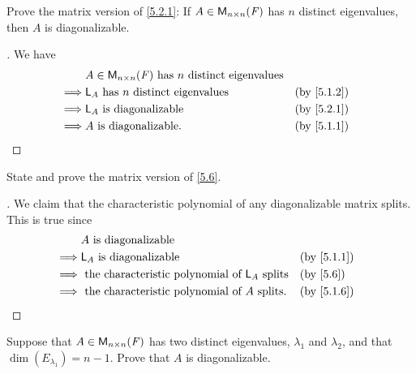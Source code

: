 \exercisesection

\setcounter{ex}{3}
\begin{ex}\label{ex:5.2.4}
	Prove the matrix version of \cref{5.2.1}:
	If \(A \in \mathsf{M}_{{n} \times n}({\mathit{F}})\) has \(n\) distinct eigenvalues, then \(A\) is diagonalizable.
\end{ex}

\begin{proof}[]
	We have
	\begin{align*}
		         & A \in \ms{n}{n}{\F} \text{ has } n \text{ distinct  eigenvalues}                 \\
		\implies & \L_A \text{ has } n \text{ distinct  eigenvalues}                &  & \by{5.1.2} \\
		\implies & \L_A \text{ is diagonalizable}                                   &  & \by{5.2.1} \\
		\implies & A \text{ is diagonalizable}.                                     &  & \by{5.1.1}
	\end{align*}
\end{proof}

\begin{ex}\label{ex:5.2.5}
	State and prove the matrix version of \cref{5.6}.
\end{ex}

\begin{proof}[]
	We claim that the characteristic polynomial of any diagonalizable matrix splits.
	This is true since
	\begin{align*}
		         & A \text{ is diagonalizable}                                                   \\
		\implies & \L_A \text{ is diagonalizable}                                &  & \by{5.1.1} \\
		\implies & \text{ the characteristic polynomial of } \L_A \text{ splits} &  & \by{5.6}   \\
		\implies & \text{ the characteristic polynomial of } A \text{ splits}.   &  & \by{5.1.6}
	\end{align*}
\end{proof}

\setcounter{ex}{7}
\begin{ex}\label{ex:5.2.8}
	Suppose that \(A \in \mathsf{M}_{{n} \times n}({\mathit{F}})\) has two distinct eigenvalues, \(\lambda_1\) and \(\lambda_2\), and that \(\dim(E_{\lambda_1}) = n - 1\).
	Prove that \(A\) is diagonalizable.
\end{ex}

